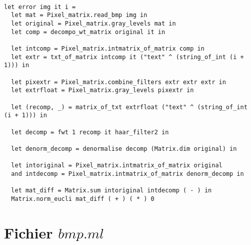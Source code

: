 \documentclass[a4paper,10pt]{report}
\theoremstyle{break}
\begin{document}
    \begin{lstlisting}

let error img it i =
  let mat = Pixel_matrix.read_bmp img in
  let original = Pixel_matrix.gray_levels mat in
  let comp = decompo_wt_matrix original it in

  let intcomp = Pixel_matrix.intmatrix_of_matrix comp in
  let extr = txt_of_matrix intcomp it ("text" ^ (string_of_int (i + 1))) in
  
  let pixextr = Pixel_matrix.combine_filters extr extr extr in
  let extrfloat = Pixel_matrix.gray_levels pixextr in

  let (recomp, _) = matrix_of_txt extrfloat ("text" ^ (string_of_int (i + 1))) in

  let decomp = fwt 1 recomp it haar_filter2 in

  let denorm_decomp = denormalise decomp (Matrix.dim original) in

  let intoriginal = Pixel_matrix.intmatrix_of_matrix original
  and intdecomp = Pixel_matrix.intmatrix_of_matrix denorm_decomp in

  let mat_diff = Matrix.sum intoriginal intdecomp ( - ) in
  Matrix.norm_eucli mat_diff ( + ) ( * ) 0
    \end{lstlisting}

  \section*{Fichier $bmp.ml$}
  
\end{document}
